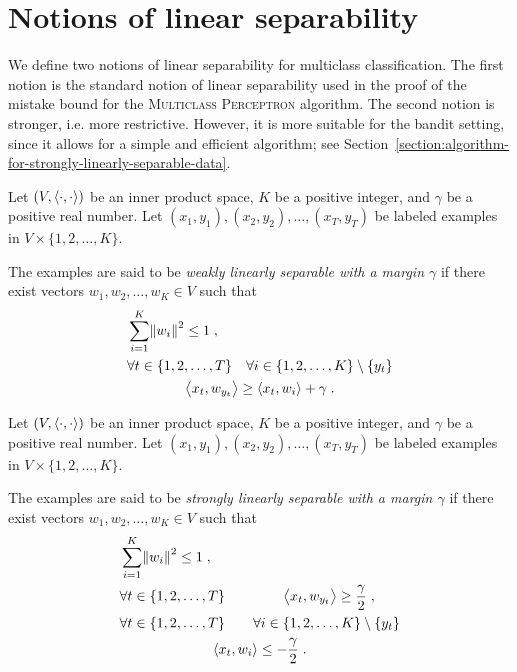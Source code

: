 \section{Notions of linear separability}
\label{section:notions-of-linear-separability}

We define two notions of linear separability for multiclass classification. The
first notion is the standard notion of linear separability used in the proof of
the mistake bound for the \textsc{Multiclass Perceptron} algorithm. The second
notion is stronger, i.e. more restrictive. However, it is more suitable for the
bandit setting, since it allows for a simple and efficient algorithm; see
Section~\ref{section:algorithm-for-strongly-linearly-separable-data}.

\begin{definition}
\label{definition:weak-linear-separability}
Let $(V,\left\langle \cdot, \cdot \right\rangle)$ be an inner product space, $K$ be a positive
integer, and $\gamma$ be a positive real number. Let $(x_1, y_1), (x_2,
y_2), \dots, (x_T, y_T)$ be labeled examples in $V \times \{1,2,\dots,K\}$.

The examples are said to be \emph{weakly linearly separable with a
margin $\gamma$} if there exist vectors $w_1, w_2, \dots, w_K \in V$ such
that
\begin{align}
\label{equation:weak-linear-separability-1}
& \sum_{i=1}^K \norm{w_i}^2 \le 1 \; , \\
\label{equation:weak-linear-separability-2}
& \begin{gathered}
\forall t \in \{1,2,\dots,T\} \quad \forall i \in \{1,2,\dots, K\} \setminus \{y_t\} \\
\left\langle x_t, w_{y_t} \right\rangle \ge \left\langle x_t, w_i \right\rangle + \gamma \; .
\end{gathered}
\end{align}
\end{definition}

\begin{definition}
\label{definition:strong-linear-separability}
Let $(V,\left\langle \cdot, \cdot \right\rangle)$ be an inner product space, $K$ be a positive
integer, and $\gamma$ be a positive real number. Let $(x_1, y_1), (x_2,
y_2), \dots, (x_T, y_T)$ be labeled examples in $V \times \{1,2,\dots,K\}$.

The examples are said to be \emph{strongly linearly separable with a
margin $\gamma$} if there exist vectors $w_1, w_2, \dots, w_K \in V$ such
that
\begin{align}
\label{equation:strong-linear-separability-1}
& \sum_{i=1}^K \norm{w_i}^2 \le 1 \; , \\
\label{equation:strong-linear-separability-2}
& \forall t \in \{1,2,\dots,T\} \qquad \qquad \left\langle x_t, w_{y_t} \right\rangle \ge \frac \gamma 2 \; , \\
\label{equation:strong-linear-separability-3}
& \begin{gathered}
\forall t \in \{1,2,\dots,T\} \qquad \forall i \in \{1,2,\dots, K\} \setminus \{y_t\} \\
\left\langle x_t, w_i \right\rangle \le - \frac \gamma 2 \; .
\end{gathered}
\end{align}
\end{definition}

